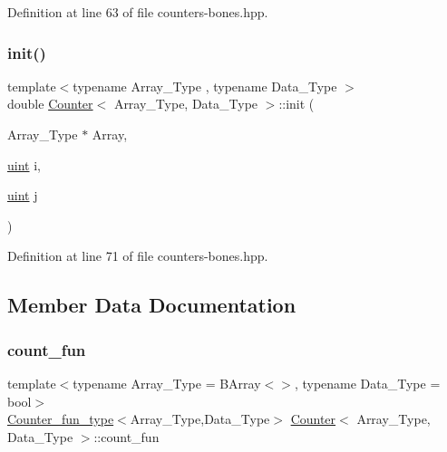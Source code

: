 Definition at line 63 of file counters-\/bones.\+hpp.

\mbox{\label{class_counter_ae0451979ddc51a5fbf00de78c37d3216}} 
\subsubsection{\texorpdfstring{init()}{init()}}
{\footnotesize\ttfamily template$<$typename Array\+\_\+\+Type , typename Data\+\_\+\+Type $>$ \\
double \hyperlink{class_counter}{Counter}$<$ Array\+\_\+\+Type, Data\+\_\+\+Type $>$\+::init (\begin{DoxyParamCaption}\item[{Array\+\_\+\+Type $\ast$}]{Array,  }\item[{\hyperlink{typedefs_8hpp_a91ad9478d81a7aaf2593e8d9c3d06a14}{uint}}]{i,  }\item[{\hyperlink{typedefs_8hpp_a91ad9478d81a7aaf2593e8d9c3d06a14}{uint}}]{j }\end{DoxyParamCaption})\hspace{0.3cm}{\ttfamily [inline]}}



Definition at line 71 of file counters-\/bones.\+hpp.



\subsection{Member Data Documentation}
\mbox{\label{class_counter_a804d287379ef9b4204a0838edcce3b71}} 
\subsubsection{\texorpdfstring{count\+\_\+fun}{count\_fun}}
{\footnotesize\ttfamily template$<$typename Array\+\_\+\+Type = B\+Array$<$$>$, typename Data\+\_\+\+Type = bool$>$ \\
\hyperlink{typedefs_8hpp_ac0160f52f564dea3ac033b374cffbfe7}{Counter\+\_\+fun\+\_\+type}$<$Array\+\_\+\+Type,Data\+\_\+\+Type$>$ \hyperlink{class_counter}{Counter}$<$ Array\+\_\+\+Type, Data\+\_\+\+Type $>$\+::count\+\_\+fun}



